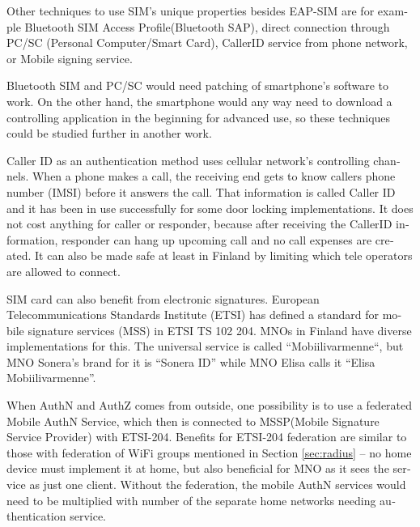 \documentclass[12pt,a4paper,english]{tutthesis}
\begin{document}
\begin{otherlanguage}{english}
Other techniques  to use SIM's unique properties besides EAP-SIM
are for example Bluetooth SIM Access Profile(Bluetooth  SAP), 
direct connection through PC/SC (Personal\- Computer/Smart\- Card),
CallerID service from phone network, or
Mobile signing service.



Bluetooth SIM and PC/SC would need patching of smartphone's software
to work.  On the other hand, the smartphone would any way need to
download  a controlling application
in the beginning for advanced use, so these techniques could be
studied further in another work.

Caller ID as an authentication method uses cellular network's controlling
channels. When a phone makes a call, the receiving end gets 
to know callers phone number (IMSI) before it answers the call.
That information is called Caller ID and it has been in use
successfully for some door locking implementations. 
It does not cost anything for caller or responder,
because after receiving the CallerID  information, responder can hang
up upcoming call and no call expenses are created.
 It can also be made safe at least in Finland
by limiting which tele operators are allowed to connect.
















SIM card can also benefit from electronic signatures.
European Telecommunications Standards Institute (ETSI) has defined a
standard for mobile signature services (MSS) in ETSI TS 102 204.
MNOs in Finland have diverse implementations for this. The universal 
service is called ``Mobiilivarmenne``, but MNO Sonera's brand for it
is ``Sonera ID'' while MNO Elisa calls it ``Elisa Mobiilivarmenne''.

When AuthN and AuthZ comes from outside, one possibility is to use a
federated Mobile AuthN Service, which then is connected to  MSSP(Mobile
Signature Service Provider) with ETSI-204. Benefits for ETSI-204
federation are similar to those with federation of WiFi groups
mentioned in Section \ref{sec:radius} -- no home device must implement it at home,
but also beneficial for  MNO as it sees the service as just one
client.  Without the federation, the mobile AuthN services would need to be
multiplied with number of the separate home networks  needing authentication service.




\end{otherlanguage}
\end{document}
